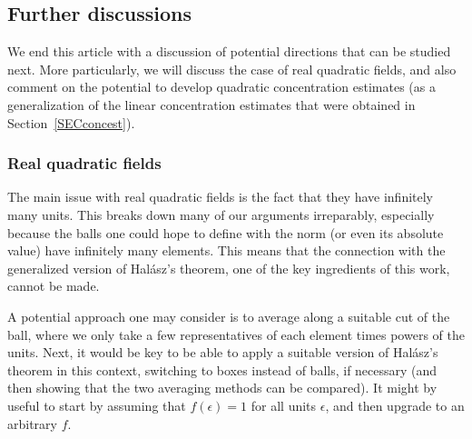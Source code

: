 \documentclass[11pt]{amsart}
\newtheorem{theorem}[lemma]{Theorem}
\theoremstyle{definition}
\newtheorem*{remark}{Remark}
\newcommand{\N}{{\mathbb N}}
\newcommand{\Z}{{\mathbb Z}}
\newcommand{\e}{\epsilon}
\begin{document}

\subsection{Further discussions}\label{SEC: further}
We end this article with a discussion of potential directions that can be studied next. More particularly, we will discuss the case of real quadratic fields, and also comment on the potential to develop quadratic concentration estimates (as a generalization of the linear concentration estimates that were obtained in Section~\ref{SECconcest}).


\subsubsection{Real quadratic fields}
The main issue with real quadratic fields is the fact that they have infinitely many units. This breaks down many of our arguments irreparably, especially because the balls one could hope to define with the norm (or even its absolute value) have infinitely many elements. This means that the connection with the generalized version of Hal\'asz's theorem, one of the key ingredients of this work, cannot be made.


A potential approach one may consider is to average along a suitable cut of the ball, where we only take a few representatives of each element times powers of the units. Next, it would be key to be able to apply a suitable version of Hal\'asz's theorem in this context, switching to boxes instead of balls, if necessary (and then showing that the two averaging methods can be compared). It might by useful to start by assuming that $f(\e)=1$ for all units $\e$, and then upgrade to an arbitrary $f$.
\end{document}
